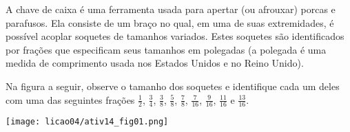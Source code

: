 \begin{atividade}{}
\end{atividade}

\begin{atividade}{}\label{chap4-ativ14}


A chave de caixa é uma ferramenta usada para apertar (ou afrouxar) porcas e parafusos. Ela consiste
de um braço no qual, em uma de suas extremidades, é possível acoplar soquetes de tamanhos variados.
Estes soquetes são identificados por frações que especificam seus tamanhos em polegadas (a polegada é uma medida de comprimento usada nos Estados Unidos e no Reino Unido).

Na figura a seguir, observe o tamanho dos soquetes e identifique cada um deles com uma das seguintes frações $\frac{1}{2}$, $\frac{3}{4}$, $\frac{3}{8}$, $\frac{5}{8}$, $\frac{7}{8}$, $\frac{7}{16}$, $\frac{9}{16}$, $\frac{11}{16}$ e $\frac{13}{16}$.

\begin{center}
    \texttt{[image: licao04/ativ14\_fig01.png]}
\end{center}

\end{atividade}

